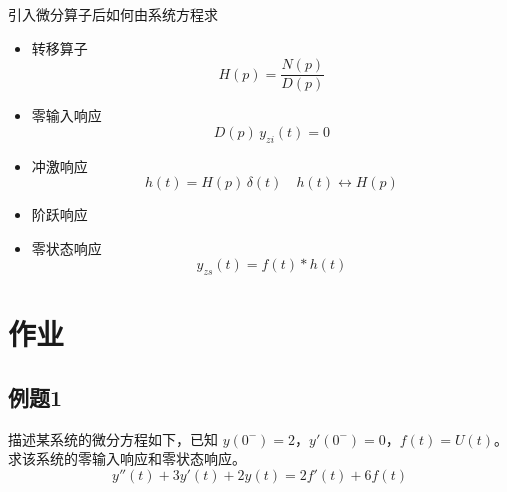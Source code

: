 \documentclass[UTF8]{ctexart}
\begin{document}
引入微分算子后如何由系统方程求

\begin{itemize}
    \item 转移算子
    $$
    H(p) = \frac{N(p)}{D(p)}
    $$
    \item 零输入响应
    $$
    D(p) \, y_{zi}(t) = 0
    $$
    \item 冲激响应
    $$
    h(t) = H(p) \, \delta(t) \quad h(t) \leftrightarrow H(p)
    $$
    \item 阶跃响应
    \item 零状态响应
    $$
    y_{zs}(t) = f(t) * h(t)
    $$
\end{itemize}

\section{作业}

\subsection{例题1}

\begin{problem}
描述某系统的微分方程如下，已知 $y(0^-)=2$，$y'(0^-)=0$，$f(t)=U(t)$。求该系统的零输入响应和零状态响应。
$$
y''(t) + 3y'(t) + 2y(t) = 2f'(t) + 6f(t)
$$
\end{problem}
\end{document}
